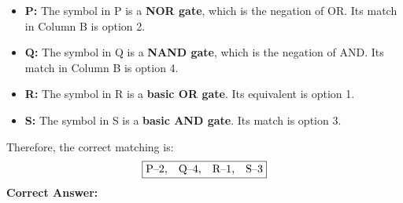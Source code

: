 \documentclass[a4paper,12pt]{article}
\begin{document}
\begin{itemize}
  \item \textbf{P:} The symbol in P is a \textbf{NOR gate}, which is the negation of OR. Its match in Column B is option 2.
  \item \textbf{Q:} The symbol in Q is a \textbf{NAND gate}, which is the negation of AND. Its match in Column B is option 4.
  \item \textbf{R:} The symbol in R is a \textbf{basic OR gate}. Its equivalent is option 1.
  \item \textbf{S:} The symbol in S is a \textbf{basic AND gate}. Its match is option 3.
\end{itemize}

\noindent Therefore, the correct matching is:
\[
\boxed{
\text{P–2,\quad Q–4,\quad R–1,\quad S–3}
}
\]
\vspace{1em}
\noindent\textbf{Correct Answer:} 
\end{document}

